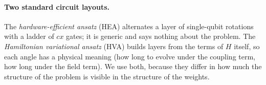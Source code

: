 \paragraph{Two standard circuit layouts.}
The \emph{hardware-efficient ansatz} (HEA) \citep{kandala2017hardware} alternates a layer of single-qubit rotations with a ladder of $cx$ gates; it is generic and says nothing about the problem. The \emph{Hamiltonian variational ansatz} (HVA) \citep{wecker2015progress,wiersema2020exploring} builds layers from the terms of $H$ itself, so each angle has a physical meaning (how long to evolve under the coupling term, how long under the field term). We use both, because they differ in how much the structure of the problem is visible in the structure of the weights.
